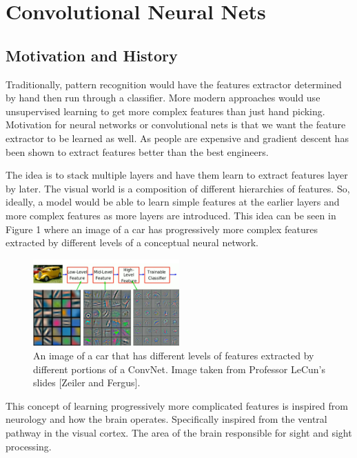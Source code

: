\chapter{Convolutional Neural Nets}

\section{Motivation and History}

Traditionally, pattern recognition would have the features extractor determined by hand then run through a classifier.
More modern approaches would use unsupervised learning to get more complex features than just hand picking.
Motivation for neural networks or convolutional nets is that we want the feature extractor to be learned as well.
As people are expensive and gradient descent has been shown to extract features better than the best engineers.

The idea is to stack multiple layers and have them learn to extract features layer by later.
The visual world is a composition of different hierarchies of features.
So, ideally, a model would be able to learn simple features at the earlier layers and more complex features 
as more layers are introduced.
This idea can be seen in Figure 1 where an image of a car has progressively more complex features extracted by different
levels of a conceptual neural network.

\begin{figure}[ht]
\centering
\includegraphics[width=0.5\textwidth]{lectures/03-b/images/FeatureExtraction.png}
\caption{An image of a car that has different levels of features extracted by different portions of a ConvNet.
Image taken from Professor LeCun's slides [Zeiler and Fergus].}
\end{figure}

This concept of learning progressively more complicated features is inspired from neurology and how the brain operates.
Specifically inspired from the ventral pathway in the visual cortex.
The area of the brain responsible for sight and sight processing.

